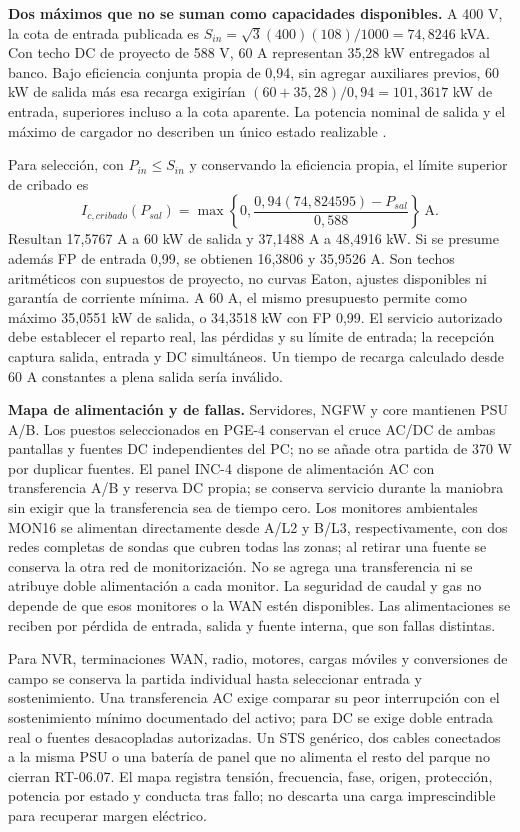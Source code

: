 \textbf{Dos máximos que no se suman como capacidades disponibles.} A 400 V, la cota de entrada publicada es $S_{in}=\sqrt{3}(400)(108)/1000=74,8246$ kVA. Con techo DC de proyecto de 588 V, 60 A representan 35,28 kW entregados al banco. Bajo eficiencia conjunta propia de 0,94, sin agregar auxiliares previos, 60 kW de salida más esa recarga exigirían $(60+35,28)/0,94=101,3617$ kW de entrada, superiores incluso a la cota aparente. La potencia nominal de salida y el máximo de cargador no describen un único estado realizable \parencites[pp.~33--35 y 98]{p7-eaton-93t-guia}{p7-eaton-93t-tecnica}.

Para selección, con $P_{in}\leq S_{in}$ y conservando la eficiencia propia, el límite superior de cribado es
\[
 I_{c,cribado}(P_{sal})=\max\left\{0,\frac{0,94(74,824595)-P_{sal}}{0,588}\right\}\ \mathrm{A}.
\]
Resultan 17,5767 A a 60 kW de salida y 37,1488 A a 48,4916 kW. Si se presume además FP de entrada 0,99, se obtienen 16,3806 y 35,9526 A. Son techos aritméticos con supuestos de proyecto, no curvas Eaton, ajustes disponibles ni garantía de corriente mínima. A 60 A, el mismo presupuesto permite como máximo 35,0551 kW de salida, o 34,3518 kW con FP 0,99. El servicio autorizado debe establecer el reparto real, las pérdidas y su límite de entrada; la recepción captura salida, entrada y DC simultáneos. Un tiempo de recarga calculado desde 60 A constantes a plena salida sería inválido.

\textbf{Mapa de alimentación y de fallas.} Servidores, NGFW y core mantienen PSU A/B. Los puestos seleccionados en PGE-4 conservan el cruce AC/DC de ambas pantallas y fuentes DC independientes del PC; no se añade otra partida de 370 W por duplicar fuentes. El panel INC-4 dispone de alimentación AC con transferencia A/B y reserva DC propia; se conserva servicio durante la maniobra sin exigir que la transferencia sea de tiempo cero. Los monitores ambientales MON16 se alimentan directamente desde A/L2 y B/L3, respectivamente, con dos redes completas de sondas que cubren todas las zonas; al retirar una fuente se conserva la otra red de monitorización. No se agrega una transferencia ni se atribuye doble alimentación a cada monitor. La seguridad de caudal y gas no depende de que esos monitores o la WAN estén disponibles. Las alimentaciones se reciben por pérdida de entrada, salida y fuente interna, que son fallas distintas.

Para NVR, terminaciones WAN, radio, motores, cargas móviles y conversiones de campo se conserva la partida individual hasta seleccionar entrada y sostenimiento. Una transferencia AC exige comparar su peor interrupción con el sostenimiento mínimo documentado del activo; para DC se exige doble entrada real o fuentes desacopladas autorizadas. Un STS genérico, dos cables conectados a la misma PSU o una batería de panel que no alimenta el resto del parque no cierran RT-06.07. El mapa registra tensión, frecuencia, fase, origen, protección, potencia por estado y conducta tras fallo; no descarta una carga imprescindible para recuperar margen eléctrico.

